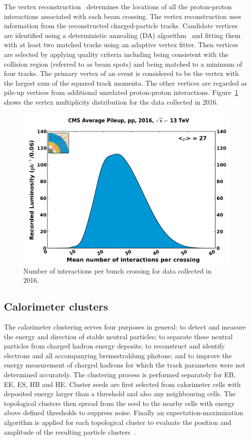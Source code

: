 \vspace{0.3cm}
The vertex reconstruction~\cite{ob_vertexconst} determines the locations of all the proton-proton interactions associated with each beam crossing. The vertex reconstruction uses information from the reconstructed charged-particle tracks. Candidate vertices are identified using a deterministic annealing (DA) algorithm~\cite{ob_DAvertex} and fitting them with at least two matched tracks using an adaptive vertex fitter. Then vertices are selected by applying quality criteria including being consistent with the collision region (referred to as beam spots) and being matched to a minimum of four tracks. The primary vertex of an event is considered to be the vertex with the largest sum of the squared track momenta. The other vertices are regarded as pile-up vertices from additional unrelated proton-proton interactions. Figure~\ref{fig:ob_Nvertex} shows the vertex multiplicity distribution for the data collected in 2016.
\begin{figure}[htbp]
\begin{center}
\includegraphics[width=0.72\linewidth]{figures/ob_Nvertex.png}
\caption{Number of interactions per bunch crossing for data collected in 2016.}
\label{fig:ob_Nvertex}
\end{center}
\end{figure}

\subsection{Calorimeter clusters}
The calorimeter clustering serves four purposes in general: to detect and measure the energy and direction of stable neutral particles; to separate these neutral particles from charged hadron energy deposits; to reconstruct and identify electrons and all accompanying bremsstrahlung photons; and to improve the energy measurement of charged hadrons for which the track parameters were not determined accurately. The clustering process is performed separately for EB, EE, ES, HB and HE. Cluster seeds are first selected from calorimeter cells with deposited energy larger than a threshold and also any neighbouring cells. The topological clusters then spread from the seed to the nearby cells with energy above defined thresholds to suppress noise. Finally an expectation-maximization algorithm is applied for each topological cluster to evaluate the position and amplitude of the resulting particle clusters~\cite{ob_pf}. 

